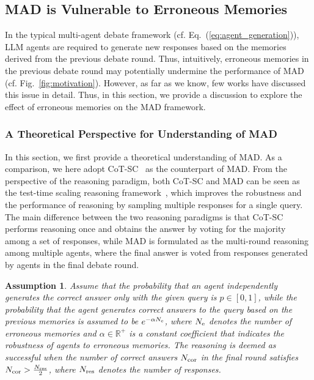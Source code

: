 \documentclass{article} %
\theoremstyle{plain}
\newtheorem{assumption}[theorem]{Assumption}
\begin{document}
\vspace{-6pt}
\subsection{MAD is Vulnerable to Erroneous Memories}
\label{subsec:vulnerability_mad}
\vspace{-4pt}
In the typical multi-agent debate framework (cf. Eq.~(\ref{eq:agent_generation})), LLM agents are required to generate new responses based on the memories derived from the previous debate round. Thus, intuitively, erroneous memories in the previous debate round may potentially undermine the performance of MAD (cf. Fig.~\ref{fig:motivation}). However, as far as we know, few works have discussed this issue in detail. Thus, in this section, we provide a discussion to explore the effect of erroneous memories on the MAD framework. 

\vspace{-6pt}
\subsubsection{A Theoretical Perspective for Understanding of MAD}
\label{subsubsec:theoretical_understanding_of_mad}
\vspace{-3pt}
In this section, we first provide a theoretical understanding of MAD. As a comparison, we here adopt CoT-SC~\citep{cot_sc} as the counterpart of MAD. From the perspective of the reasoning paradigm, both CoT-SC and MAD can be seen as the test-time scaling reasoning framework~\citep{snell2024scaling,brown2024large}, which improves the robustness and the performance of reasoning by sampling multiple responses for a single query. The main difference between the two reasoning paradigms is that CoT-SC performs reasoning once and obtains the answer by voting for the majority among a set of responses, while MAD is formulated as the multi-round reasoning among multiple agents, where the final answer is voted from responses generated by agents in the final debate round. 

\begin{assumption}\label{assumption}
    Assume that the probability that an agent independently generates the correct answer only with the given query is $p\in[0, 1]$, while the probability that the agent generates correct answers to the query based on the previous memories is assumed to be $e^{-\alpha N_{\rm e}}$, where $N_{\rm e}$ denotes the number of erroneous memories and $\alpha\in\mathbb{R^+}$ is a constant coefficient that indicates the robustness of agents to erroneous memories. The reasoning is deemed as successful when the number of correct answers $N_{\rm cor}$ in the final round satisfies $N_{\rm cor}>\frac{N_{\rm res}}2$, where $N_{\rm res}$ denotes the number of responses.
\end{assumption}
\end{document}
